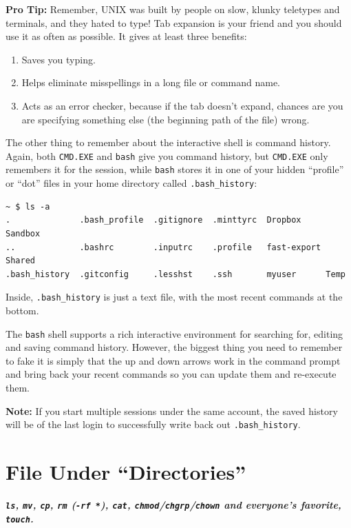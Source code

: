 \documentclass[10pt,]{book}
\numberwithin{figure}{chapter}
\begin{document}
\textbf{Pro Tip:} Remember, UNIX was built by people on slow, klunky
teletypes and terminals, and they hated to type! Tab expansion is your
friend and you should use it as often as possible. It gives at least
three benefits:

\begin{enumerate}
\def\labelenumi{\arabic{enumi}.}
\item
  Saves you typing.
\item
  Helps eliminate misspellings in a long file or command name.
\item
  Acts as an error checker, because if the tab doesn't expand, chances
  are you are specifying something else (the beginning path of the file)
  wrong.
\end{enumerate}

The other thing to remember about the interactive shell is command
history. Again, both \texttt{CMD.EXE} and \texttt{bash} give you command
history, but \texttt{CMD.EXE} only remembers it for the session, while
\texttt{bash} stores it in one of your hidden ``profile'' or ``dot''
files in your home directory called \texttt{.bash\_history}:

\begin{verbatim}
~ $ ls -a
.              .bash_profile  .gitignore  .minttyrc  Dropbox      Sandbox
..             .bashrc        .inputrc    .profile   fast-export  Shared
.bash_history  .gitconfig     .lesshst    .ssh       myuser      Temp
\end{verbatim}

Inside, \texttt{.bash\_history} is just a text file, with the most
recent commands at the bottom.

The \texttt{bash} shell supports a rich interactive environment for
searching for, editing and saving command history. However, the biggest
thing you need to remember to fake it is simply that the up and down
arrows work in the command prompt and bring back your recent commands so
you can update them and re-execute them.

\textbf{Note:} If you start multiple sessions under the same account,
the saved history will be of the last login to successfully write back
out \texttt{.bash\_history}.

\chapter{File Under ``Directories''}\label{file-under-directories}

\textbf{\emph{\texttt{ls}, \texttt{mv}, \texttt{cp}, \texttt{rm}
(\texttt{-rf *}), \texttt{cat},
\texttt{chmod}/\texttt{chgrp}/\texttt{chown} and everyone's favorite,
\texttt{touch}.}}
\end{document}
